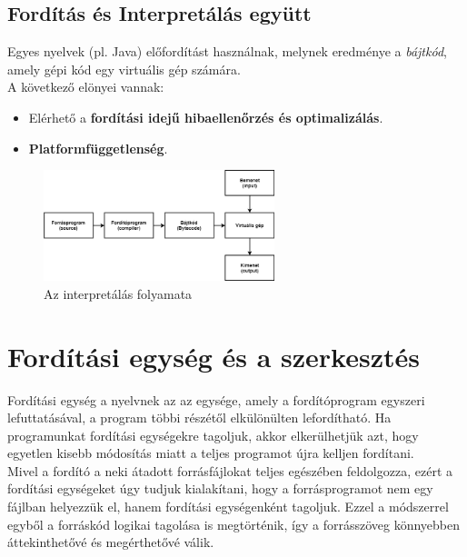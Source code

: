 \documentclass[12pt,margin=0px]{article}
\begin{document}
	
\subsection*{Fordítás és Interpretálás együtt}
		
    Egyes nyelvek (pl. Java) előfordítást használnak, melynek eredménye a \textit{bájtkód}, amely gépi kód egy virtuális gép számára.\\

    \noindent A következő elönyei vannak:
    \begin{itemize}
        \item Elérhető a \textbf{fordítási idejű hibaellenőrzés és optimalizálás}.
        \item \textbf{Platformfüggetlenség}.
    \end{itemize}
	
	\begin{figure}[H]
		\centering
		\includegraphics[width=0.6\textwidth]{img/bajtkod_folyamatabra.png}
		\caption{Az interpretálás folyamata}
		\label{fig:bajtkod_folyamatabra}
	\end{figure}
	
    \section*{Fordítási egység és a szerkesztés}

    \noindent Fordítási egység a nyelvnek az az egysége, amely a fordítóprogram egyszeri lefuttatásával, a program többi részétől elkülönülten lefordítható. Ha programunkat fordítási egységekre tagoljuk, akkor elkerülhetjük azt, hogy egyetlen kisebb módosítás miatt a teljes programot újra kelljen fordítani.\\

    \noindent Mivel a fordító a neki átadott forrásfájlokat teljes egészében feldolgozza, ezért a fordítási egységeket úgy tudjuk kialakítani, hogy a forrásprogramot nem egy fájlban helyezzük el, hanem fordítási egységenként tagoljuk. Ezzel a módszerrel egyből a forráskód logikai tagolása is megtörténik, így a forrásszöveg könnyebben áttekinthetővé és megérthetővé válik.\\
	
\end{document}
